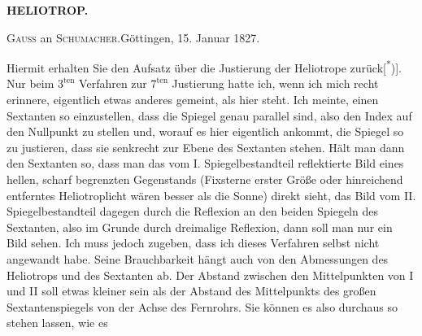 \par\clearpage
\noindent\null\hfill{\small\textbf{HELIOTROP.}}\hfill{}\par\bigskip
\begin{center}{\large\textsc{Gauss} an \textsc{Schumacher}.\quad Göttingen, 15. Januar 1827.}\end{center}
\par\noindent\hspace*{\parindent}Hiermit erhalten Sie den Aufsatz über die Justierung der Heliotrope zurück[\textsuperscript{*})]. Nur beim $3^{\mathrm{ten}}$ Verfahren zur $7^{\mathrm{ten}}$ Justierung hatte ich, wenn ich mich recht erinnere, eigentlich etwas anderes gemeint, als hier steht. Ich meinte, einen Sextanten so einzustellen, dass die Spiegel genau parallel sind, also den Index auf den  Nullpunkt zu stellen und, worauf es hier eigentlich ankommt, die Spiegel so zu justieren, dass sie senkrecht zur Ebene des Sextanten stehen. Hält man dann den Sextanten so, dass man das vom I. Spiegelbestandteil reflektierte Bild eines hellen, scharf begrenzten Gegenstands (Fixsterne erster Größe oder hinreichend entferntes Heliotroplicht wären besser als die Sonne) direkt sieht, das Bild vom II. Spiegelbestandteil dagegen durch die Reflexion an den beiden Spiegeln des Sextanten, also im Grunde durch dreimalige Reflexion, dann soll man nur ein Bild sehen. Ich muss jedoch zugeben, dass ich dieses Verfahren selbst nicht angewandt habe. Seine Brauchbarkeit hängt auch von den Abmessungen des Heliotrops und des Sextanten ab. Der Abstand zwischen den Mittelpunkten von I und II soll etwas kleiner sein als der Abstand des Mittelpunkts des großen Sextantenspiegels von der Achse des Fernrohrs. Sie können es also durchaus so stehen lassen, wie es

